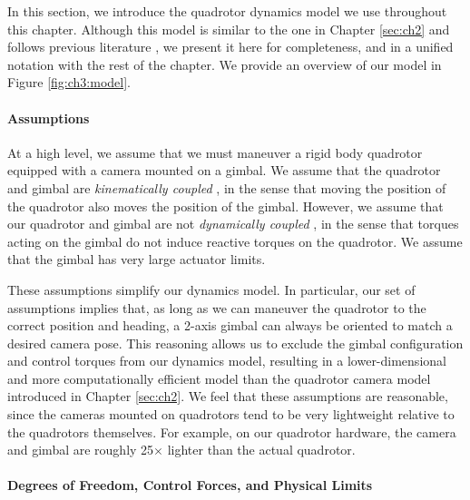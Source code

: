 In this section, we introduce the quadrotor dynamics model we use throughout this chapter.
Although this model is similar to the one in Chapter \ref{sec:ch2} and follows previous literature \cite{joubert:2015,mellinger:2011}, we present it here for completeness, and in a unified notation with the rest of the chapter.
We provide an overview of our model in Figure \ref{fig:ch3:model}.

\paragraph{Assumptions}

At a high level, we assume that we must maneuver a rigid body quadrotor equipped with a camera mounted on a gimbal. 
We assume that the quadrotor and gimbal are \emph{kinematically coupled} \cite{kondak:2013}, in the sense that moving the position of the quadrotor also moves the position of the gimbal.
However, we assume that our quadrotor and gimbal are not \emph{dynamically coupled} \cite{kondak:2013}, in the sense that torques acting on the gimbal do not induce reactive torques on the quadrotor.
We assume that the gimbal has very large actuator limits.

These assumptions simplify our dynamics model. 
In particular, our set of assumptions implies that, as long as we can maneuver the quadrotor to the correct position and heading, a 2-axis gimbal can always be oriented to match a desired camera pose.
This reasoning allows us to exclude the gimbal configuration and control torques from our dynamics model, resulting in a lower-dimensional and more computationally efficient model than the quadrotor camera model introduced in Chapter \ref{sec:ch2}.
We feel that these assumptions are reasonable, since the cameras mounted on quadrotors tend to be very lightweight relative to the quadrotors themselves.
For example, on our quadrotor hardware, the camera and gimbal are roughly 25$\times$ lighter than the actual quadrotor.

\paragraph{Degrees of Freedom, Control Forces, and Physical Limits}

